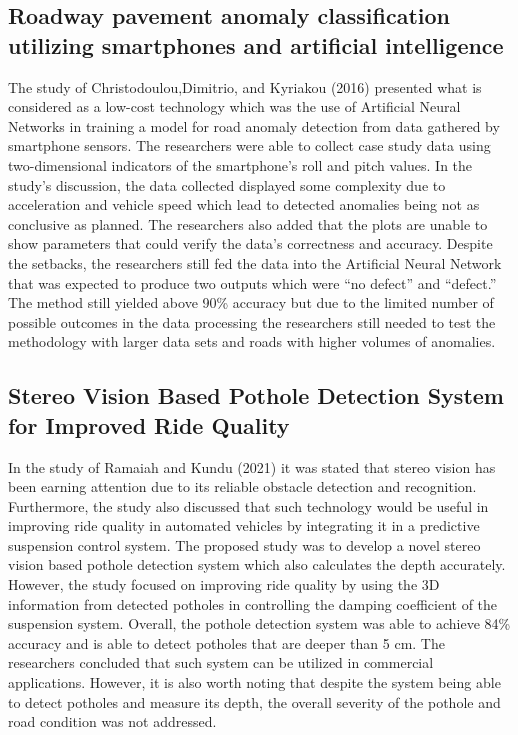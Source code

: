 \subsection{Roadway pavement anomaly classification utilizing smartphones and artificial intelligence}
The study of Christodoulou,Dimitrio, and Kyriakou (2016) presented what is considered as a low-cost technology which was the use of Artificial Neural Networks in training a model for road anomaly detection from data gathered by smartphone sensors. The researchers were able to collect case study data using two-dimensional indicators of the smartphone’s roll and pitch values. In the study’s discussion, the data collected displayed some complexity due to acceleration and vehicle speed which lead to detected anomalies being not as conclusive as planned. The researchers also added that the plots are unable to show parameters that could verify the data’s correctness and accuracy. Despite the setbacks, the researchers still fed the data into the Artificial Neural Network that was expected to produce two outputs which were “no defect” and “defect.” The method still yielded above 90\% accuracy but due to the limited number of possible outcomes in the data processing the researchers still needed to test the methodology with larger data sets and roads with higher volumes of anomalies.

\subsection{Stereo Vision Based Pothole Detection System for Improved Ride Quality}
In the study of Ramaiah and Kundu (2021) it was stated that stereo vision has been earning attention due to its reliable obstacle detection and recognition. Furthermore, the study also discussed that such technology would be useful in improving ride quality in automated vehicles by integrating it in a predictive suspension control system. The proposed study was to develop a novel stereo vision based pothole detection system which also calculates the depth accurately. However, the study focused on improving ride quality by using the 3D information from detected potholes in controlling the damping coefficient of the suspension system. Overall, the pothole detection system was able to achieve 84\% accuracy and is able to detect potholes that are deeper than 5 cm. The researchers concluded that such system can be utilized in commercial applications. However, it is also worth noting that despite the system being able to detect potholes and measure its depth, the overall severity of the pothole and road condition was not addressed.

